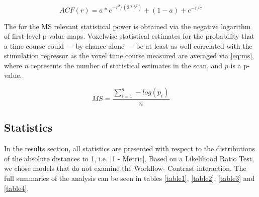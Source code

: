 \begin{equation} \label{eq:acf}
        ACF(r)
        = a * e^{ -r^{2}/ (2 * b^{2}) } + (1 - a) + e^{-r/c}
\end{equation}

The for the MS relevant statistical power is obtained via the negative logarithm of first-level p-value maps.
Voxelwise statistical estimates for the probability that a time course could --- by chance alone --- be at least as well correlated with the stimulation regressor as the voxel time course measured are averaged via \cref{eq:ms}, where $n$ represents the number of statistical estimates in the scan, and $p$ is a p-value.

\begin{equation} \label{eq:ms}
        M\!S = \frac{\sum_{i=1}^n -log(p_i)}{n}
\end{equation}

\subsection{Statistics}

In the results section, all statistics are presented with respect to the distributions of the absolute distances to 1, i.e. |1 - Metric|.
Based on a Likelihood Ratio Test, we chose models that do not examine the Workflow- Contrast interaction.
The full summaries of the analysis can be seen in tables \cref{table1}, \cref{table2}, \cref{table3} and \cref{table4}.
